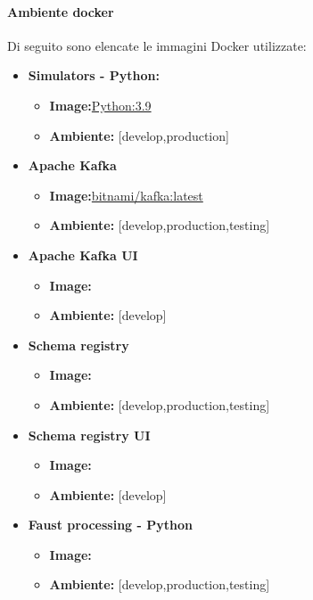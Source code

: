 \paragraph*{Ambiente docker}

Di seguito sono elencate le immagini Docker utilizzate:
\begin{itemize}
  \item \textbf{Simulators - Python:} 
  \begin{itemize}
    \item \textbf{Image:}\href{https://hub.docker.com/_/python}{Python:3.9}
    \item \textbf{Ambiente:} [develop,production]
  \end{itemize}
  \item \textbf{Apache Kafka} 
 \begin{itemize}
    \item \textbf{Image:}\href{https://hub.docker.com/layers/bitnami/kafka/latest/images/sha256-4894d89d28f8e06a7d8a064efdc2dc9cb61dd205721c61296b6d033ad4824a91?context=explore}{bitnami/kafka:latest}
    \item \textbf{Ambiente:} [develop,production,testing]
  \end{itemize}
  \item \textbf{Apache Kafka UI} 
 \begin{itemize}
    \item \textbf{Image:}
    \item \textbf{Ambiente:} [develop]
  \end{itemize}
  \item \textbf{Schema registry} 
 \begin{itemize}
    \item \textbf{Image:}
    \item \textbf{Ambiente:} [develop,production,testing]
  \end{itemize}
  \item \textbf{Schema registry UI} 
 \begin{itemize}
    \item \textbf{Image:}
    \item \textbf{Ambiente:} [develop]
  \end{itemize}
  \item \textbf{Faust processing - Python} 
 \begin{itemize}
    \item \textbf{Image:}
    \item \textbf{Ambiente:} [develop,production,testing]
  \end{itemize}

\end{itemize}
